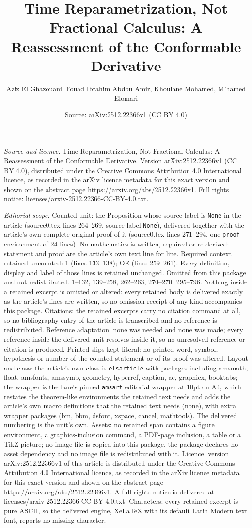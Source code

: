\documentclass[10pt,a4paper]{amsart}
\title[Time Reparametrization, Not Fractional Calculus: A Reassessm]{Time Reparametrization, Not Fractional Calculus: A Reassessment of the Conformable Derivative}
\author{Aziz El Ghazouani, Fouad Ibrahim Abdou Amir, Khoulane Mohamed, M'hamed Elomari}
\date{Source: arXiv:2512.22366v1 (CC BY 4.0)}
\begin{document}
\maketitle

\noindent\emph{Source and licence.} Time Reparametrization, Not Fractional Calculus: A Reassessment of the Conformable Derivative. Version arXiv:2512.22366v1 (CC BY 4.0), distributed under the Creative Commons Attribution 4.0 International licence, as recorded in the arXiv licence metadata for this exact version and shown on the abstract page https://arxiv.org/abs/2512.22366v1. Full rights notice: licenses/arxiv-2512.22366-CC-BY-4.0.txt.\par\smallskip

\noindent\textit{Editorial scope.} Counted unit: the Proposition whose source label is \texttt{None} in the article (source0.tex lines 264--269, source label \texttt{None}), delivered together with the article's own complete original proof of it (source0.tex lines 271--294, one \texttt{proof} environment of 24 lines). No mathematics is written, repaired or re-derived: statement and proof are the article's own text line for line. Required context retained uncounted: 1 (lines 133--138); OE (lines 259--261). Every definition, display and label of those lines is retained unchanged. Omitted from this package and not redistributed: 1--132, 139--258, 262--263, 270--270, 295--796. Nothing inside a retained excerpt is omitted or altered: every retained body is delivered exactly as the article's lines are written, so no omission receipt of any kind accompanies this package. Citations: the retained excerpts carry no citation command at all, so no bibliography entry of the article is transcribed and no reference is redistributed. Reference adaptation: none was needed and none was made; every reference inside the delivered unit resolves inside it, so no unresolved reference or citation is produced. Printed slips kept literal: no printed word, symbol, hypothesis or number of the counted statement or of its proof was altered. Layout and class: the article's own class is \texttt{elsarticle} with packages including amsmath, float, amsfonts, amssymb, geometry, hyperref, caption, ae, graphicx, booktabs; the wrapper is the lane's pinned \texttt{amsart} editorial wrapper at 10pt on A4, which restates the theorem-like environments the retained text needs and adds the article's own macro definitions that the retained text needs (none), with extra wrapper packages (bm, bbm, dsfont, xspace, cancel, mathtools). The delivered numbering is the unit's own. Assets: no retained span contains a figure environment, a graphics-inclusion command, a PDF-page inclusion, a table or a TikZ picture; no image file is copied into this package, the package declares no asset dependency and no image file is redistributed with it. Licence: version arXiv:2512.22366v1 of this article is distributed under the Creative Commons Attribution 4.0 International licence, as recorded in the arXiv licence metadata for this exact version and shown on the abstract page https://arxiv.org/abs/2512.22366v1. A full rights notice is delivered at licenses/arxiv-2512.22366-CC-BY-4.0.txt. Characters: every retained excerpt is pure ASCII, so the delivered engine, XeLaTeX with its default Latin Modern text font, reports no missing character.
\end{document}
